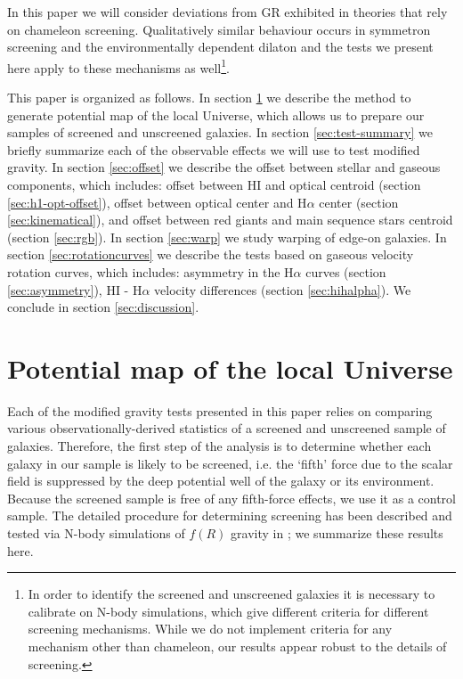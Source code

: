 \documentclass[useAMS,usenatbib,twocolumn]{mn2e}
\newcommand{\ha}{H$\alpha$}
\begin{document}
In this paper we will consider deviations from GR exhibited in
theories that rely on chameleon screening.
Qualitatively similar behaviour occurs in symmetron screening
\citep{hinterbichler10} and the environmentally dependent
dilaton \citep{brax10} and the tests we  present here apply
to these mechanisms as well\footnote{In order to identify the screened and
  unscreened galaxies it is necessary to calibrate on N-body simulations,
  which give different criteria for different screening mechanisms. While
  we do not implement criteria for any mechanism other than chameleon,  
  our results appear robust to the details of screening.}. 

This paper is organized as follows. In section \ref{pot-sec} we describe the
method to generate potential map of the local Universe, which allows us to
prepare our samples of screened and unscreened galaxies.
In section  \ref{sec:test-summary} we briefly summarize each of the observable
effects we will use to test modified gravity.
In section \ref{sec:offset} we describe the offset between stellar
and gaseous components, which includes:
offset between HI and optical centroid (section \ref{sec:h1-opt-offset}), 
offset between optical center and \ha{} center (section \ref{sec:kinematical}), 
and offset between red giants and main sequence stars centroid (section
\ref{sec:rgb}).
In section \ref{sec:warp} we study warping of edge-on galaxies.
In section \ref{sec:rotationcurves} we describe the tests based on
 gaseous velocity rotation curves, which includes: asymmetry in the
\ha{} curves (section \ref{sec:asymmetry}), HI - \ha{} velocity differences
(section \ref{sec:hihalpha}). We conclude in section \ref{sec:discussion}.

\section{Potential map of the local Universe}
\label{pot-sec}
Each of the modified gravity tests presented in this paper relies on comparing
various observationally-derived statistics of a screened and unscreened sample
of galaxies.
Therefore, the first step of the analysis is to determine whether each
galaxy in our sample is likely to be screened, i.e. the `fifth' force due
to the  scalar field is suppressed by the deep 
potential well of the galaxy or its environment.  
Because the screened sample is free of any fifth-force effects, we use
it as a control sample.  The detailed procedure for 
determining screening has been described and tested via N-body simulations
of $f(R)$ gravity in \cite{cabre2012}; we summarize these results here.
\end{document}
